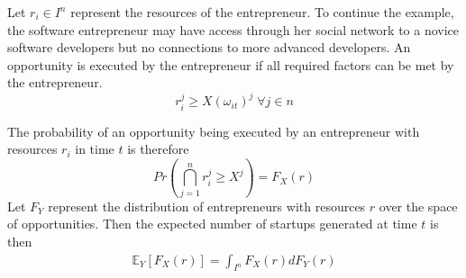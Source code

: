 \documentclass[12pt]{article}
\begin{document}
Let $r_i \in I^n$ represent the resources of the entrepreneur. To continue the example, the software entrepreneur may have access through her social network to a novice software developers but no connections to more advanced developers. An opportunity is executed by the entrepreneur if all required factors can be met by the entrepreneur. 
$$r_i^j \ge X(\omega_{it})^j \; \forall j \in n$$

\begin{comment}
We call an idea \textit{unbounded} for an individual if the idea can be executed and \textit{single bounded} on dimension $k$ if
$$\alpha_i^k = X(\omega{it})^k \wedge  \alpha_i^j > X(\omega{it})^j \; \forall j \ne k \in n$$
\end{comment}

The probability of an opportunity being executed by an entrepreneur with resources $r_i$ in time $t$ is therefore 
$$Pr\left(\bigcap _{j=1}^n  r_i^j \ge X^j\right) = F_X(r)$$
Let $F_Y$ represent the distribution of entrepreneurs with resources $r$ over the space of opportunities. Then the expected number of startups generated at time $t$ is then 
\begin{align}
\mathbb{E}_{Y}[F_X(r)]=\int_{I^n} F_X(r) dF_Y(r)
\label{eq:total}
\end{align}
\end{document}

